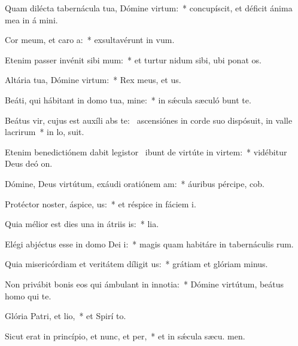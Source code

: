 \item Quam dilécta tabernácula tua, Dómine virtum:~* concupíscit, et déficit ánima mea in á mini.
\item Cor meum, et caro a:~* exsultavérunt in  vum.
\item Etenim passer invénit sibi mum:~* et turtur nidum sibi, ubi ponat  os.
\item Altária tua, Dómine virtum:~* Rex meus, et  us.
\item Beáti, qui hábitant in domo tua, mine:~* in sǽcula sæculó bunt te.
\item Beátus vir, cujus est auxíli abs te:~\pscross{} ascensiónes in corde suo dispósuit, in valle lacrirum~* in lo,  suit.
\item Etenim benedictiónem dabit legistor~\pscross{} ibunt de virtúte in virtem:~* vidébitur Deus deó  on.
\item Dómine, Deus virtútum, exáudi oratiónem am:~* áuribus pércipe,  cob.
\item Protéctor noster, áspice, us:~* et réspice in fáciem  i.
\item Quia mélior est dies una in átriis is:~*  lia.
\item Elégi abjéctus esse in domo Dei i:~* magis quam habitáre in tabernáculis rum.
\item Quia misericórdiam et veritátem díligit us:~* grátiam et glóriam  minus.
\item Non privábit bonis eos qui ámbulant in innotia:~* Dómine virtútum, beátus homo qui   te.
\item Glória Patri, et lio,~* et Spirí to.
\item Sicut erat in princípio, et nunc, et per,~* et in sǽcula sæcu. men.
